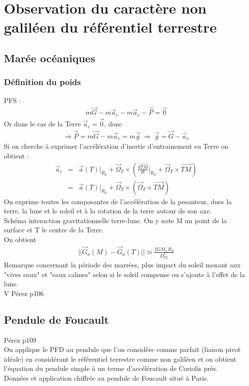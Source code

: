 \documentclass[12pt,prb,aps,epsf]{report}
\begin{document}
\section{Observation du caractère non galiléen du référentiel terrestre}
\subsection{Marée océaniques}
\subsubsection*{Définition du poids}

PFS :
\begin{eqnarray}
m\vec{G} - m\vec{a}_e - m\vec{a}_c - \vec{P} = \vec{0}
\end{eqnarray}
Or dans le cas de la Terre $\vec{a}_c=\vec{0}$, donc 
\begin{eqnarray} 
\Rightarrow \vec{P} = m\vec{G} - m\vec{a}_e = m\vec{g}\; \Rightarrow \; \vec{g} = \vec{G} - \vec{a}_e
\end{eqnarray}
Si on cherche à exprimer l'accélération d'inertie d'entrainement su Terre on obtient :
\begin{eqnarray}
\vec{a}_e &=& \vec{a}(T)|_{R_0} + \vec{\Omega}_T\times( \frac{d \vec{TM}}{dt}|_{R_T} + \vec{\Omega}_T\times \vec{TM})\\
&=& \vec{a}(T)|_{R_0} + \vec{\Omega}_T\times(\vec{\Omega}_T\times \vec{TM})
\end{eqnarray}
On exprime toutes les composantes de l'accélération de la pesanteur, dues la terre, la lune et le soleil et à la rotation de la terre autour de son axe.\\
Schéma interaction gravitationnelle terre-lune. On y note M un point de la surface et T le centre de la Terre. \\
On obtient 
\begin{eqnarray}
|| \vec{G}_a(M)-\vec{G}_a(T)|| \simeq \frac{2GM_LR_T}{D_{TL}^3}
\end{eqnarray}
Remarque concernant la période des marrées, plus impact du soleil menant aux "vives eaux" et "eaux calmes" selon si le soleil compense ou s'ajoute à l'effet de la lune.\\
V Pérez p106

\subsection{Pendule de Foucault}
Pérez p109\\
On applique le PFD au pendule que l'on considère comme parfait (liaison pivot idéale) en considérant le référentiel terrestre comme non galiléen et on obtient l'équation du pendule simple à un terme d'accélération de Coriolis près.\\
Données et application chiffrée au pendule de Foucault situé à Paris.
\end{document}
